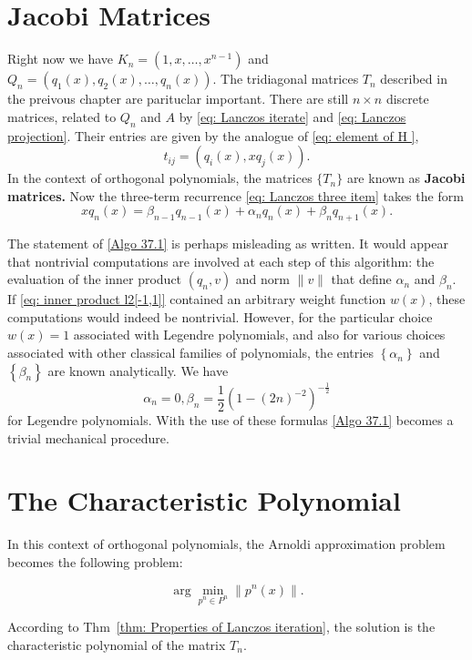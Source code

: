 \section{Jacobi Matrices} 
Right now we have $ K_n = (1,x,\ldots ,x^{n-1}) $ and $ Q_n = (q_1(x), q_2(x),\ldots ,q_n(x)) $. The tridiagonal matrices $ T_n $ described in the preivous chapter are parituclar important. There are still $ n\times n $ discrete matrices, related to $ Q_n $ and $ A $ by \eqref{eq: Lanczos iterate} and \eqref{eq: Lanczos projection}.  Their entries are given by the analogue of \eqref{eq: element of H }, 
\[
    t_{ij} = (q_i(x), x q_j(x)). 
\]
In the context of orthogonal polynomials, the matrices $ \{T_n\}  $ are known as  \textbf{Jacobi matrices.} Now the three-term recurrence \eqref{eq: Lanczos three item} takes the form 
\[
    xq_n(x) = \beta_{n-1}q_{n-1}(x) + \alpha _n q_n(x) + \beta _n q_{n+1}(x). 
\]

The statement of \autoref{Algo 37.1} is perhaps misleading as written. It would appear that nontrivial computations are involved at each step of this algorithm: the evaluation of the inner product $\left(q_n, v\right)$ and norm $\|v\|$ that define $\alpha_n$ and $\beta_n$. If \eqref{eq: inner product l2[-1,1]} contained an arbitrary weight function $w(x)$, these computations would indeed be nontrivial. However, for the particular choice $w(x)=1$ associated with Legendre polynomials, and also for various choices associated with other classical families of polynomials, the entries $\left\{\alpha_n\right\}$ and $\left\{\beta_n\right\}$ are known analytically. We have
\begin{equation}
\label{eq: anbn for Legendre polynomials}
    \alpha _n = 0, \beta _n = \frac{1}{2} (1-(2n)^{-2})^{-\frac{1}{2}}
\end{equation}
for Legendre polynomials.  With the use of these formulas \autoref{Algo 37.1} becomes a trivial mechanical procedure.  

\section{The Characteristic Polynomial} 
In this context of orthogonal polynomials, the Arnoldi approximation problem becomes the following problem: 

\begin{example}
\label{eg: Orthogonal Polynomials Approximation Problem}
\[
    \arg \min_{p^n \in P^n} \|p^n (x)\|. 
\]

\end{example}
 According to Thm~\ref{thm: Properties of Lanczos iteration}, the solution is the characteristic polynomial of the matrix $ T_n $.  

